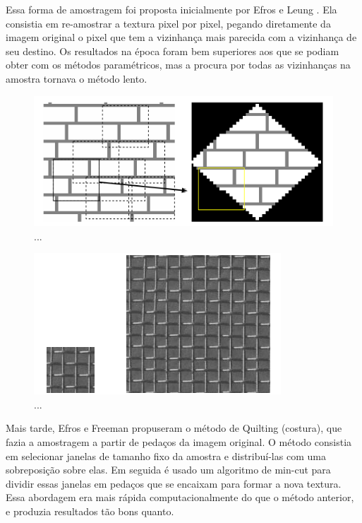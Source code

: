 Essa forma de amostragem foi proposta
inicialmente por Efros e Leung \cite{Efros1999}.
Ela consistia em re-amostrar a textura
pixel por pixel, pegando diretamente
da imagem original o pixel que tem
a vizinhança mais parecida com a vizinhança
de seu destino. Os resultados na época
foram bem superiores aos que se podiam
obter com os métodos paramétricos,
mas a procura por todas as vizinhanças
na amostra tornava o método lento.

\begin{figure}[!ht]
	\centering
	\includegraphics[width=\linewidth*2/3]{files/assets/articles/efros3.png}
	\caption{...}
	\label{img:preview}
\end{figure}
\begin{figure}[!ht]
	\centering
	\includegraphics[width=\linewidth*2/3]{files/assets/articles/efros1.png}
	\caption{...}
	\label{img:preview}
\end{figure}

Mais tarde, Efros e Freeman \cite{Efros2001}
propuseram o método de Quilting (costura),
que fazia a amostragem a partir
de pedaços da imagem original. 
O método consistia em selecionar
janelas de tamanho fixo da amostra
e distribuí-las com uma sobreposição
sobre elas. Em seguida é usado
um algoritmo de min-cut para dividir
essas janelas em pedaços que se encaixam
para formar a nova textura.
Essa abordagem era mais rápida 
computacionalmente do que o método
anterior, e produzia resultados
tão bons quanto.

